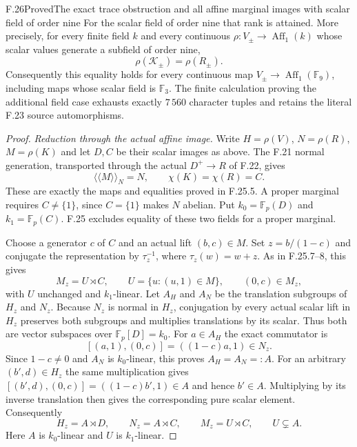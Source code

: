 \begin{claim}{F.26}{Proved}{The exact trace obstruction and all affine marginal images with scalar field of order nine}
For the scalar field of order nine that rank is attained.
More precisely, for every finite field $k$ and every
continuous $\rho:V_\pm\to\operatorname{Aff}_1(k)$ whose
scalar values generate a subfield of order nine,
\[
                         \rho(\mathcal K_\pm)=\rho(R_\pm).
                                                               \tag{F.26.4}
\]
Consequently this equality holds for every continuous
map $V_\pm\to\operatorname{Aff}_1(\mathbb F_9)$, including
maps whose scalar field is $\mathbb F_3$. The finite
calculation proving the additional field case exhausts
exactly $7\,560$ character tuples and retains the
literal F.23 source automorphisms.
\end{claim}

\begin{proof}
\emph{Reduction through the actual affine image.}
Write $H=\rho(V)$, $N=\rho(R)$, $M=\rho(K)$ and
let $D,C$ be their scalar images as above. The F.21
normal generation, transported through the actual
$D^+\to R$ of F.22, gives
\[
 \langle\!\langle M\rangle\!\rangle_N=N,\qquad
                         \chi(K)=\chi(R)=C.                   \tag{F.26.5}
\]
These are exactly the maps and equalities proved
in F.25.5. A proper marginal requires $C\ne\{1\}$,
since $C=\{1\}$ makes $N$ abelian. Put
$k_0=\mathbb F_p(D)$ and $k_1=\mathbb F_p(C)$.
F.25 excludes equality of these two fields for
a proper marginal.

Choose a generator $c$ of $C$ and an actual lift
$(b,c)\in M$. Set $z=b/(1-c)$ and conjugate the
representation by $\tau_z^{-1}$, where
$\tau_z(w)=w+z$. As in F.25.7--8, this gives
\[
 M_z=U\rtimes C,\qquad
 U=\{u:(u,1)\in M\},\qquad (0,c)\in M_z,
                                                               \tag{F.26.6}
\]
with $U$ unchanged and $k_1$-linear. Let $A_H$ and
$A_N$ be the translation subgroups of $H_z$ and
$N_z$. Because $N_z$ is normal in $H_z$, conjugation
by every actual scalar lift in $H_z$ preserves both
subgroups and multiplies translations by its scalar.
Thus both are vector subspaces over
$\mathbb F_p[D]=k_0$. For $a\in A_H$ the exact commutator is
\[
                  [(a,1),(0,c)]=((1-c)a,1)\in N_z .
                                                               \tag{F.26.7}
\]
Since $1-c\ne0$ and $A_N$ is $k_0$-linear, this proves
$A_H=A_N=:A$. For an arbitrary $(b',d)\in H_z$ the
same multiplication gives
$[(b',d),(0,c)]=((1-c)b',1)\in A$ and hence $b'\in A$.
Multiplying by its inverse translation then gives
the corresponding pure scalar element. Consequently
\[
 H_z=A\rtimes D,\qquad N_z=A\rtimes C,\qquad
 M_z=U\rtimes C,\qquad U\subsetneq A .                          \tag{F.26.8}
\]
Here $A$ is $k_0$-linear and $U$ is $k_1$-linear.


\end{proof}

